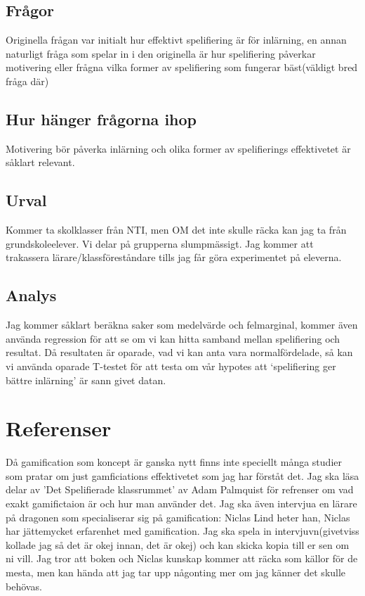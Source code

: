 \documentclass[11p]{article}
\begin{document}
\subsection{Frågor} Originella frågan var initialt hur effektivt spelifiering är för inlärning, en annan naturligt fråga som spelar in i den originella är hur spelifiering påverkar motivering eller frågna vilka former av spelifiering som fungerar bäst(väldigt bred fråga där)

\subsection{Hur hänger frågorna ihop} Motivering bör påverka inlärning och olika former av spelifierings effektivetet är såklart relevant.

\subsection{Urval} Kommer ta skolklasser från NTI, men OM det inte skulle räcka kan jag ta från grundskoleelever. Vi delar på grupperna slumpmässigt. Jag kommer att trakassera lärare/klassföreståndare tills jag får göra experimentet på eleverna.

\subsection{Analys} Jag kommer såklart beräkna saker som medelvärde och felmarginal, kommer även använda regression för att se om vi kan hitta samband mellan spelifiering och resultat. Då resultaten är oparade, vad vi kan anta vara normalfördelade, så kan vi använda oparade T-testet för att testa om vår hypotes att ‘spelifiering ger bättre inlärning’ är sann givet datan.

\section{Referenser}
Då gamification som koncept är ganska nytt finns inte speciellt många studier som pratar om just gamficiations effektivetet som jag har förståt det. Jag ska läsa delar av 'Det Spelifierade klassrummet' av Adam Palmquist för refrenser om vad exakt gamifictaion är och hur man använder det. Jag ska även intervjua en lärare på dragonen som specialiserar sig på gamification: Niclas Lind heter han, Niclas har jättemycket erfarenhet med gamification. Jag ska spela in intervjuvn(givetviss kollade jag så det är okej innan, det är okej) och kan skicka kopia till er sen om ni vill. Jag tror att boken och Niclas kunskap kommer att räcka som källor för de mesta, men kan hända att jag tar upp någonting mer om jag känner det skulle behövas.
\end{document}
